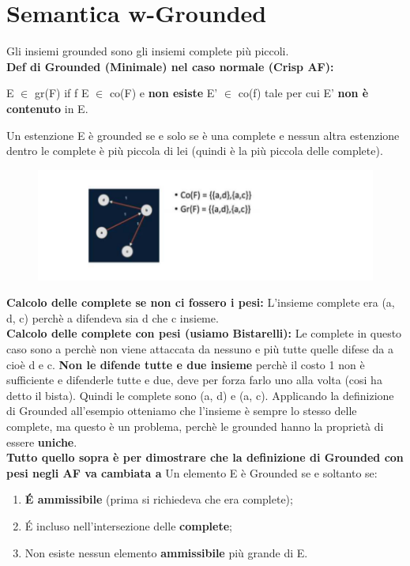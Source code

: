 \section{Semantica w-Grounded}
Gli insiemi grounded sono gli insiemi complete più piccoli.
\\\textbf{Def di Grounded (Minimale) nel caso normale (Crisp AF):}
\begin{center}
    E $\in$ gr(F) if f E $\in$ co(F) e \textbf{non esiste} E' $\in$ co(f) tale per cui E' \textbf{non è contenuto} in E.
\end{center}
Un estenzione E è grounded se e solo se è una complete e nessun altra estenzione dentro le complete è più piccola di lei (quindi è la più piccola delle complete).
\begin{figure}[htp]
	\centering
    \includegraphics[width=12cm, keepaspectratio]{img/Cap6/w-grounded.png}
\end{figure}
\textbf{Calcolo delle complete se non ci fossero i pesi:} L’insieme complete era (a, d, c) perchè a difendeva sia d che c insieme. 
\\\textbf{Calcolo delle complete con pesi (usiamo Bistarelli):} Le complete in questo caso sono a perchè non viene attaccata da nessuno e più tutte quelle difese da a cioè d e c. \textbf{Non le difende tutte e due insieme} perchè il costo 1 non è sufficiente e difenderle tutte e due, deve per forza farlo uno alla volta (cosi ha detto il bista). Quindi le complete sono (a, d) e (a, c). Applicando la definizione di Grounded all’esempio otteniamo che l’insieme è sempre lo stesso delle complete, ma questo è un problema, perchè le grounded hanno la proprietà di essere \textbf{uniche}.
\\\textbf{Tutto quello sopra è per dimostrare che la definizione di Grounded con pesi negli AF va cambiata a}
\newpage
Un elemento E è Grounded se e soltanto se:
\begin{enumerate}
    \item \textbf{ É ammissibile} (prima si richiedeva che era complete);
    \item  É incluso nell’intersezione delle \textbf{complete};
    \item  Non esiste nessun elemento \textbf{ammissibile} più grande di E.
\end{enumerate}
